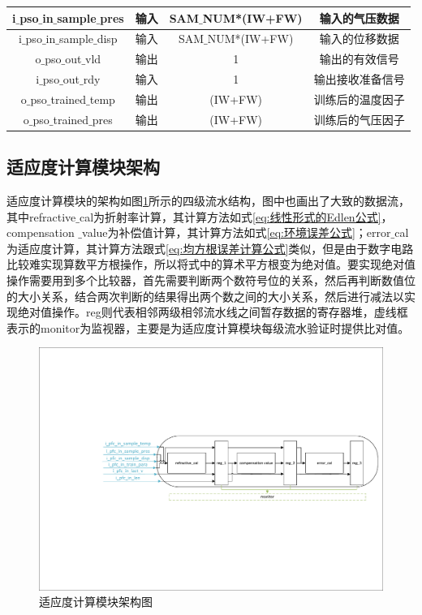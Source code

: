 \begin{table}[H]
\begin{tabular}{c|c|c|c}
        i$\_$pso$\_$in$\_$sample$\_$pres            & 输入      & SAM$\_$NUM*(IW+FW)    & 输入的气压数据            \\ \hline
        i$\_$pso$\_$in$\_$sample$\_$disp            & 输入      & SAM$\_$NUM*(IW+FW)    & 输入的位移数据            \\ \hline
        o$\_$pso$\_$out$\_$vld                      & 输出      & 1                     & 输出的有效信号            \\ \hline
        i$\_$pso$\_$out$\_$rdy                      & 输入      & 1                     & 输出接收准备信号          \\ \hline
        o$\_$pso$\_$trained$\_$temp                 & 输出      & (IW+FW)               & 训练后的温度因子          \\ \hline
        o$\_$pso$\_$trained$\_$pres                 & 输出      & (IW+FW)               & 训练后的气压因子          \\ \hline
    \end{tabular}
  \end{table}

\subsection{适应度计算模块架构}
适应度计算模块的架构如图\ref{fig:适应度计算模块架构图}所示的四级流水结构，图中也画出了大致的数据流，其中refractive$\_$cal为折射率计算，其计算方法如式\eqref{eq:线性形式的Edlen公式}，compensation $\_$value为补偿值计算，其计算方法如式\eqref{eq:环境误差公式}；error$\_$cal为适应度计算，其计算方法跟式\eqref{eq:均方根误差计算公式}类似，但是由于数字电路比较难实现算数平方根操作，所以将式中的算术平方根变为绝对值。要实现绝对值操作需要用到多个比较器，首先需要判断两个数符号位的关系，然后再判断数值位的大小关系，结合两次判断的结果得出两个数之间的大小关系，然后进行减法以实现绝对值操作。reg则代表相邻两级相邻流水线之间暂存数据的寄存器堆，虚线框表示的monitor为监视器，主要是为适应度计算模块每级流水验证时提供比对值。
  \begin{figure}[htb]
    \centering
    \includegraphics[width=14cm]{fig/5-fig/适应度计算模块架构图.pdf}
    \caption{适应度计算模块架构图}
    \label{fig:适应度计算模块架构图}
\end{figure}

